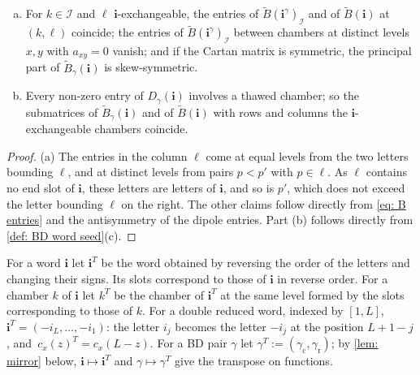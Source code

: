 \documentclass[a4paper]{amsart}
\numberwithin{equation}{section}
\theoremstyle{definition}
\theoremstyle{remark}
\newcommand{\mcI}{\mathcal{I}}
\newcommand{\bfi}{\mathbf{i}}
\newcommand{\tB}{\widetilde{B}}
\newcommand{\rr}{\mathrm{r}}
\newcommand{\cc}{\mathrm{c}}
\begin{document}
\begin{lemma}
  \label{lem: local entries}
  \begin{enumerate}[(a)]
    \item For $k\in\mcI$ and $\ell$ $\bfi$-exchangeable, the entries of $\tB(\bfi^\gamma)_\mcI$ and of $\tB(\bfi)$ at $(k,\ell)$ coincide; the entries of $\tB(\bfi^\gamma)_\mcI$ between chambers at distinct levels $x,y$ with $a_{xy}=0$ vanish; and if the Cartan matrix is symmetric, the principal part of $\tB_\gamma(\bfi)$ is skew-symmetric.
    \item Every non-zero entry of $D_\gamma(\bfi)$ involves a thawed chamber; so the submatrices of $\tB_\gamma(\bfi)$ and of $\tB(\bfi)$ with rows and columns the $\bfi$-exchangeable chambers coincide.
  \end{enumerate}
\end{lemma}
\begin{proof}
  (a) The entries in the column $\ell$ come at equal levels from the two letters bounding $\ell$, and at distinct levels from pairs $p<p'$ with $p\in\ell$.
  As $\ell$ contains no end slot of $\bfi$, these letters are letters of $\bfi$, and so is $p'$, which does not exceed the letter bounding $\ell$ on the right.
  The other claims follow directly from \eqref{eq: B entries} and the antisymmetry of the dipole entries.
  Part (b) follows directly from \cref{def: BD word seed}(c).
\end{proof}

For a word $\bfi$ let $\bfi^T$ be the word obtained by reversing the order of the letters and changing their signs.
Its slots correspond to those of $\bfi$ in reverse order.
For a chamber $k$ of $\bfi$ let $k^T$ be the chamber of $\bfi^T$ at the same level formed by the slots corresponding to those of $k$.
For a double reduced word, indexed by $[1,L]$, $\bfi^T=(-i_L,\dots,-i_1)$: the letter $i_j$ becomes the letter $-i_j$ at the position $L+1-j$, and~$c_x(z)^T=c_x(L-z)$.
For a BD pair $\gamma$ let $\gamma^T:=(\gamma_{\cc},\gamma_{\rr})$; by \cref{lem: mirror} below, $\bfi\mapsto\bfi^T$ and $\gamma\mapsto\gamma^T$ give the transpose on functions.
\end{document}
